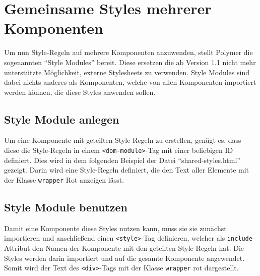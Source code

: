 \section{Gemeinsame Styles mehrerer Komponenten}\label{gemeinsame-styles-mehrerer-komponenten}

Um nun Style-Regeln auf mehrere Komponenten anzuwenden, stellt Polymer die sogenannten ``Style Modules'' bereit. Diese ersetzen die ab Version 1.1 nicht mehr unterstützte Möglichkeit, externe Stylesheets zu verwenden. Style Modules sind dabei nichts anderes als Komponenten, welche von allen Komponenten importiert werden können, die diese Styles anwenden sollen.


\subsection{Style Module anlegen}\label{style-module-anlegen}

Um eine Komponente mit geteilten Style-Regeln zu erstellen, genügt es, dass diese die Style-Regeln in einem \texttt{\textless{}dom-module\textgreater{}}-Tag mit einer beliebigen ID definiert. Dies wird in dem folgenden Beispiel der Datei ``shared-styles.html'' gezeigt. Darin wird eine Style-Regeln definiert, die den Text aller Elemente mit der Klasse \texttt{wrapper} Rot anzeigen lässt.

\begin{Shaded}
\begin{Highlighting}[]
\KeywordTok{>}
       \KeywordTok{\{}  \KeywordTok{;} \KeywordTok{\}}
\end{Highlighting}
\end{Shaded}


\subsection{Style Module benutzen}\label{style-module-benutzen}

Damit eine Komponente diese Styles nutzen kann, muss sie sie zunächst importieren und anschließend einen \texttt{\textless{}style\textgreater{}}-Tag definieren, welcher als \texttt{include}-Attribut den Namen der Komponente mit den geteilten Style-Regeln hat. Die Styles werden darin importiert und auf die gesamte Komponente angewendet. Somit wird der Text des \texttt{\textless{}div\textgreater{}}-Tags mit der Klasse \texttt{wrapper} rot dargestellt.

